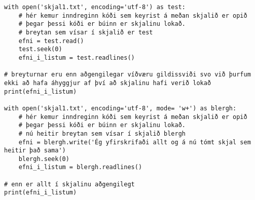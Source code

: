 \begin{lstlisting}[caption=Hér sjáum við nýja leið til að opna skjal og loka því eftir notkun sjálfkrafa, label=lst:skjalavinnsla-open-as]
with open('skjal1.txt', encoding='utf-8') as test:
	# hér kemur inndreginn kóði sem keyrist á meðan skjalið er opið 
	# þegar þessi kóði er búinn er skjalinu lokað.
	# breytan sem vísar í skjalið er test
	efni = test.read()
	test.seek(0)
	efni_i_listum = test.readlines()

# breyturnar eru enn aðgengilegar víðværu gildissviði svo við þurfum ekki að hafa áhyggjur af því að skjalinu hafi verið lokað
print(efni_i_listum)

with open('skjal1.txt', encoding='utf-8', mode= 'w+') as blergh:
	# hér kemur inndreginn kóði sem keyrist á meðan skjalið er opið 
	# þegar þessi kóði er búinn er skjalinu lokað.
	# nú heitir breytan sem vísar í skjalið blergh
	efni = blergh.write('Ég yfirskrifaði allt og á nú tómt skjal sem heitir það sama')
	blergh.seek(0)
	efni_i_listum = blergh.readlines()

# enn er allt í skjalinu aðgengilegt
print(efni_i_listum)
\end{lstlisting}
